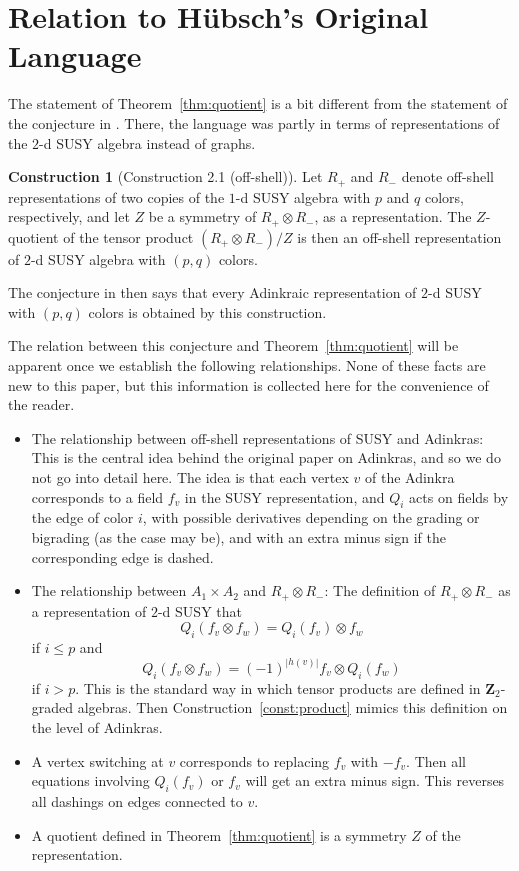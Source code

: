 \documentclass[12pt,twoside,singlespace]{article}
\numberwithin{equation}{section}
\theoremstyle{definition}
\newtheorem{construction}[equation]{Construction}
\newcommand{\ZZ}{\mathbf{Z}}
\begin{document}
\section{Relation to H\"ubsch's Original Language}
\label{app:repn}
The statement of Theorem~\ref{thm:quotient} is a bit different from the statement of the conjecture in \cite{hubsch:weaving}.  There, the language was partly in terms of representations of the $2$-d SUSY algebra instead of graphs.
\begin{construction}[Construction 2.1 (off-shell)] Let $R_+$ and $R_-$ denote off-shell representations of two copies of the $1$-d SUSY algebra with $p$ and $q$ colors, respectively, and let $Z$ be a symmetry of $R_+ \otimes R_-$, as a representation. The $Z$-quotient of the tensor product $(R_+ \otimes R_-)/Z$ is then an off-shell representation of $2$-d SUSY algebra with $(p,q)$ colors.
\end{construction}
The conjecture in \cite{hubsch:weaving} then says that every Adinkraic representation of $2$-d SUSY with $(p,q)$ colors is obtained by this construction.

The relation between this conjecture and Theorem~\ref{thm:quotient} will be apparent once we establish the following relationships.  None of these facts are new to this paper, but this information is collected here for the convenience of the reader.
\begin{itemize}
\item The relationship between off-shell representations of SUSY and Adinkras: This is the central idea behind the original paper on Adinkras\cite{d2l:first}, and so we do not go into detail here.  The idea is that each vertex $v$ of the Adinkra corresponds to a field $f_v$ in the SUSY representation, and $Q_i$ acts on fields by the edge of color $i$, with possible derivatives depending on the grading or bigrading (as the case may be), and with an extra minus sign if the corresponding edge is dashed.
\item The relationship between $A_1\times A_2$ and $R_+\otimes R_-$: The definition of $R_+\otimes R_-$ as a representation of $2$-d SUSY that
\[Q_i(f_v\otimes f_w)=Q_i(f_v)\otimes f_w \]
if $i\le p$ and
\[Q_i(f_v\otimes f_w)=(-1)^{|h(v)|}f_v\otimes Q_i(f_w)\]
if $i >p$.  This is the standard way in which tensor products are defined in $\ZZ_2$-graded algebras.\cite{bott_tu,freed}  Then Construction~\ref{const:product} mimics this definition on the level of Adinkras.
\item A vertex switching at $v$ corresponds to replacing $f_v$ with $-f_v$.  Then all equations involving $Q_i(f_v)$ or $f_v$ will get an extra minus sign.  This reverses all dashings on edges connected to $v$.
\item A quotient defined in Theorem~\ref{thm:quotient} is a symmetry $Z$ of the representation.
\end{itemize}



\end{document}
